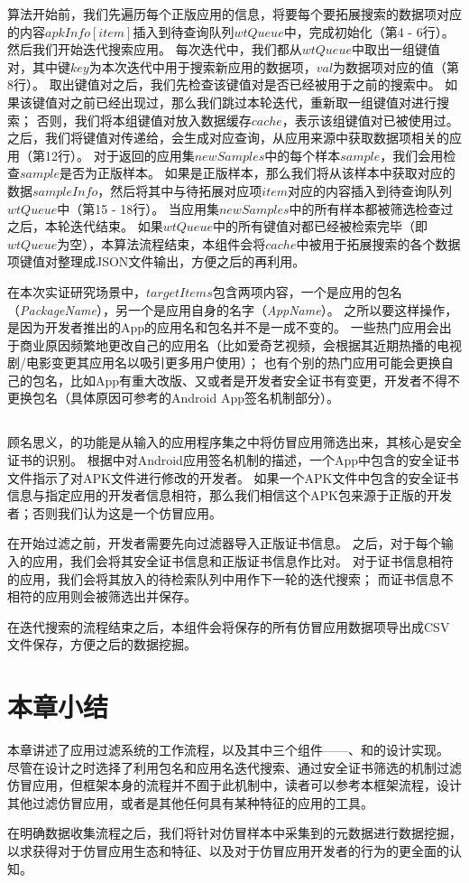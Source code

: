 算法开始前，我们先遍历每个正版应用的信息，将要每个要拓展搜索的数据项对应的内容$apkInfo[item]$插入到待查询队列$wtQueue$中，完成初始化（第4 - 6行）。
然后我们开始迭代搜索应用。
每次迭代中，我们都从$wtQueue$中取出一组键值对，其中键$key$为本次迭代中用于搜索新应用的数据项，$val$为数据项对应的值（第8行）。
取出键值对之后，我们先检查该键值对是否已经被用于之前的搜索中。
如果该键值对之前已经出现过，那么我们跳过本轮迭代，重新取一组键值对进行搜索；
否则，我们将本组键值对放入数据缓存$cache$，表示该组键值对已被使用过。
之后，我们将键值对传递给\componentA ，\componentA 会生成对应查询，从应用来源中获取数据项相关的应用（第12行）。
对于\componentA 返回的应用集$newSamples$中的每个样本$sample$，我们会用\componentC 检查$sample$是否为正版样本。
如果是正版样本，那么我们将从该样本中获取对应的数据$sampleInfo$，然后将其中与待拓展对应项$item$对应的内容插入到待查询队列$wtQueue$中（第15 - 18行）。
当应用集$newSamples$中的所有样本都被筛选检查过之后，本轮迭代结束。
如果$wtQueue$中的所有键值对都已经被检索完毕（即$wtQueue$为空），本算法流程结束，本组件会将$cache$中被用于拓展搜索的各个数据项键值对整理成JSON文件输出，方便之后的再利用。

在本次实证研究场景中，$targetItems$包含两项内容，一个是应用的包名（\emph{PackageName}），另一个是应用自身的名字（\emph{AppName}）。
之所以要这样操作，是因为开发者推出的App的应用名和包名并不是一成不变的。
一些热门应用会出于商业原因频繁地更改自己的应用名（比如爱奇艺视频，会根据其近期热播的电视剧/电影变更其应用名以吸引更多用户使用）；
也有个别的热门应用可能会更换自己的包名，比如App有重大改版、又或者是开发者安全证书有变更，开发者不得不更换包名（具体原因可参考的Android App签名机制部分）。

\subsection{\componentC }
顾名思义，\componentC 的功能是从输入的应用程序集之中将仿冒应用筛选出来，其核心是安全证书的识别。
根据中对Android应用签名机制的描述，一个App中包含的安全证书文件指示了对APK文件进行修改的开发者。
如果一个APK文件中包含的安全证书信息与指定应用的开发者信息相符，那么我们相信这个APK包来源于正版的开发者；否则我们认为这是一个仿冒应用。

在开始过滤之前，开发者需要先向过滤器导入正版证书信息。
之后，对于每个输入的应用，我们会将其安全证书信息和正版证书信息作比对。
对于证书信息相符的应用，我们会将其放入\componentB 的待检索队列中用作下一轮的迭代搜索；
而证书信息不相符的应用则会被筛选出并保存。

在迭代搜索的流程结束之后，本组件会将保存的所有仿冒应用数据项导出成CSV文件保存，方便之后的数据挖掘。

\section{本章小结}
本章讲述了应用过滤系统\mytool 的工作流程，以及其中三个组件——\componentA 、\componentB 和\componentC 的设计实现。
尽管\mytool 在设计之时选择了利用包名和应用名迭代搜索、通过安全证书筛选的机制过滤仿冒应用，但框架本身的流程并不囿于此机制中，读者可以参考本框架流程，设计其他过滤仿冒应用，或者是其他任何具有某种特征的应用的工具。

在明确数据收集流程之后，我们将针对仿冒样本中采集到的元数据进行数据挖掘，以求获得对于仿冒应用生态和特征、以及对于仿冒应用开发者的行为的更全面的认知。
